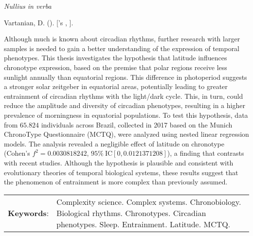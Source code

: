 
\begin{epigrafe}[] %
\vspace*{\fill} %
\begin{flushright}
\textit{Nullius in verba}\footnotemark{}

\end{flushright}
\end{epigrafe}


\begin{resumoenv}[\resumoname]
Vartanian, D. ({\imprimirdata}). \textit{\imprimirtitulo} [{\imprimirtipodetituloacademico}'s {\imprimirtipotrabalho}, {\imprimiruniversidade}].


Although much is known about circadian rhythms, further research with
larger samples is needed to gain a better understanding of the
expression of temporal phenotypes. This thesis investigates the
hypothesis that latitude influences chronotype expression, based on the
premise that polar regions receive less sunlight annually than
equatorial regions. This difference in photoperiod suggests a stronger
solar zeitgeber in equatorial areas, potentially leading to greater
entrainment of circadian rhythms with the light/dark cycle. This, in
turn, could reduce the amplitude and diversity of circadian phenotypes,
resulting in a higher prevalence of morningness in equatorial
populations. To test this hypothesis, data from \(65.824\) individuals
across Brazil, collected in 2017 based on the Munich ChronoType
Questionnaire (MCTQ), were analyzed using nested linear regression
models. The analysis revealed a negligible effect of latitude on
chronotype (Cohen's \(f^2 = 0.0030818242\),
\(95\% \ \text{IC}[0, 0.0121371208]\)), a finding that contrasts with
recent studies. Although the hypothesis is plausible and consistent with
evolutionary theories of temporal biological systems, these results
suggest that the phenomenon of entrainment is more complex than
previously assumed.


\begin{tabular}{p{2.3cm} p{13.6cm}}
  \textbf{Keywords}: & Complexity science. Complex systems. Chronobiology. Biological rhythms. Chronotypes. Circadian phenotypes. Sleep. Entrainment. Latitude. MCTQ.
\end{tabular}
\end{resumoenv}


